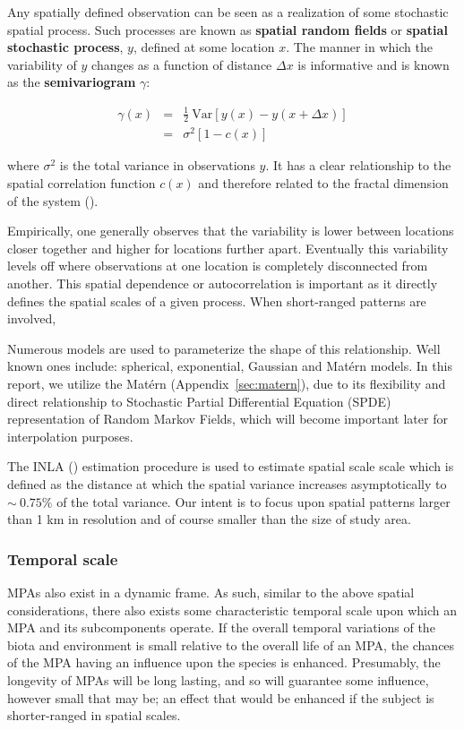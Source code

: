 \documentclass[letterpaper,portrait,11pt]{scrartcl}
\numberwithin{equation}{section}		%
\numberwithin{figure}{section}		%
\numberwithin{table}{section}				%
\begin{document}
Any spatially defined observation can be seen as a realization of some stochastic spatial process. Such  processes are known as \textbf{spatial random fields} or \textbf{spatial stochastic process}, $y$, defined at some location $x$. The manner in which the variability of $y$ changes as a function of distance $\Delta x$ is informative and is known as the \textbf{semivariogram} $\gamma$:

\begin{eqnarray*}
\label{eq:semivariogram}
\gamma(x) &=& \frac{1}{2} \ \textrm{Var} [ y(x) - y(x + \Delta x)]  \\
&=& \sigma^2 [1-c(x)] 
\end{eqnarray*}

where $\sigma^2$ is the total variance in observations $y$. It has a clear relationship to the spatial correlation function $c(x)$ and therefore related to the fractal dimension of the system (\cite{Schepers:2002:fractals}). 

Empirically, one generally observes that the variability is lower between locations closer together and higher for locations further apart. Eventually this variability levels off where observations at one location is completely disconnected from another. This spatial dependence or autocorrelation is important as it directly defines the spatial scales of a given process. When short-ranged patterns are involved, 

Numerous models are used to parameterize the shape of this relationship. Well known ones include: spherical, exponential, Gaussian and Mat\'{e}rn models. In this report, we utilize the Mat\'{e}rn (Appendix~\ref{sec:matern}), due to its flexibility and direct relationship to Stochastic Partial Differential Equation (SPDE) representation of Random Markov Fields, which will become important later for interpolation purposes. 

The INLA (\cite{rinla}) estimation procedure is used to estimate spatial scale scale which is defined as the distance at which the spatial variance increases asymptotically to $\sim~0.75\%$ of the total variance. Our intent is to focus upon spatial patterns larger than 1 km in resolution and of course smaller than the size of study area. 

\subsubsection{Temporal scale}
\label{sec:interpolationTS}

MPAs also exist in a dynamic frame. As such, similar to the above spatial considerations, there also exists some characteristic temporal scale upon which an MPA and its subcomponents operate. If the overall temporal variations of the biota and environment is small relative to the overall life of an MPA, the chances of the MPA having an influence upon the species is enhanced. Presumably, the longevity of MPAs will be long lasting, and so will guarantee some influence, however small that may be; an effect that would be enhanced if the subject is shorter-ranged in spatial scales.
\end{document}
